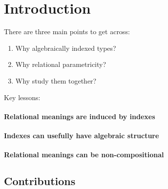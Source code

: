 \section{Introduction}
\label{sec:introduction}

There are three main points to get across:
\begin{enumerate}
\item Why algebraically indexed types?
\item Why relational parametricity?
\item Why study them together?
\end{enumerate}

Key lessons:

\paragraph{Relational meanings are induced by indexes}

\paragraph{Indexes can usefully have algebraic structure}

\paragraph{Relational meanings can be non-compositional}

\subsection{Contributions}
\label{sec:contributions}

